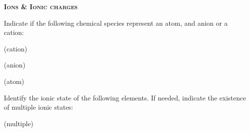 \documentclass[main.tex]{subfiles}
\begin{document}
\newpage
\setdoublesep{0.35700 em}  %
\setatomsep{1.78500 em}    %
\setbondoffset{0.18265 em} %
\newcommand{\bondwidth}{0.06642 em} %
\setbondstyle{line width = \bondwidth}
\fancyhfoffset[E,O]{0pt}
\setlength{\columnsep}{30pt}
\begin{conclusion}
\end{conclusion}
\begin{multicols*}{2}\setcounter{numA}{1}  %


{\raggedright\textsc{\textbf{Ions \& Ionic charges}}\par}

\begin{question}[ID=\the\value{numA}]
Indicate if the following chemical species represent an atom, and anion or a cation:
\begin{inparaenum}[(a)]
\item {}
\item {} 
 \item {} 
\end{inparaenum}
\end{question}
\begin{solution}
\begin{inparaenum}[(a)]
\item {} (cation)
\item {} (anion)
 \item {} (atom)
\end{inparaenum}\hspace{0.1cm}\end{solution}


\begin{question}[ID=\the\value{numA}]
Identify the ionic state of the following elements. If needed, indicate the existence of multiple ionic states:
\begin{inparaenum}[(a)]
\item {} %
\item {} %
\item {} %
\item {} %
\item {} %
\end{inparaenum}
\end{question}
\begin{solution}
\begin{inparaenum}[(a)]
\item {}
\item  {}
 \item {}
  \item {}
  \item {}  (multiple)
\end{inparaenum}\hspace{0.1cm}\end{solution}


\end{multicols*}
\end{document}
